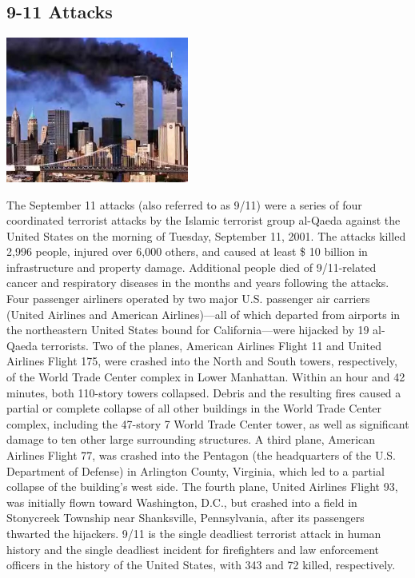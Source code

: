 \documentclass[11pt]{report}
\begin{document}
\subsection{9-11 Attacks}
\vspace{2mm}\begin{center}\includegraphics[width=6cm]{./img/9-11.jpg}\end{center}
The September 11 attacks (also referred to as 9/11) were a series of four coordinated terrorist attacks by the Islamic terrorist group al-Qaeda against the United States on the morning of Tuesday, September 11, 2001. The attacks killed 2,996 people, injured over 6,000 others, and caused at least \$ 10 billion in infrastructure and property damage. Additional people died of 9/11-related cancer and respiratory diseases in the months and years following the attacks.
Four passenger airliners operated by two major U.S. passenger air carriers (United Airlines and American Airlines)—all of which departed from airports in the northeastern United States bound for California—were hijacked by 19 al-Qaeda terrorists. Two of the planes, American Airlines Flight 11 and United Airlines Flight 175, were crashed into the North and South towers, respectively, of the World Trade Center complex in Lower Manhattan. Within an hour and 42 minutes, both 110-story towers collapsed. Debris and the resulting fires caused a partial or complete collapse of all other buildings in the World Trade Center complex, including the 47-story 7 World Trade Center tower, as well as significant damage to ten other large surrounding structures. A third plane, American Airlines Flight 77, was crashed into the Pentagon (the headquarters of the U.S. Department of Defense) in Arlington County, Virginia, which led to a partial collapse of the building's west side. The fourth plane, United Airlines Flight 93, was initially flown toward Washington, D.C., but crashed into a field in Stonycreek Township near Shanksville, Pennsylvania, after its passengers thwarted the hijackers. 9/11 is the single deadliest terrorist attack in human history and the single deadliest incident for firefighters and law enforcement officers in the history of the United States, with 343 and 72 killed, respectively.
\end{document}
